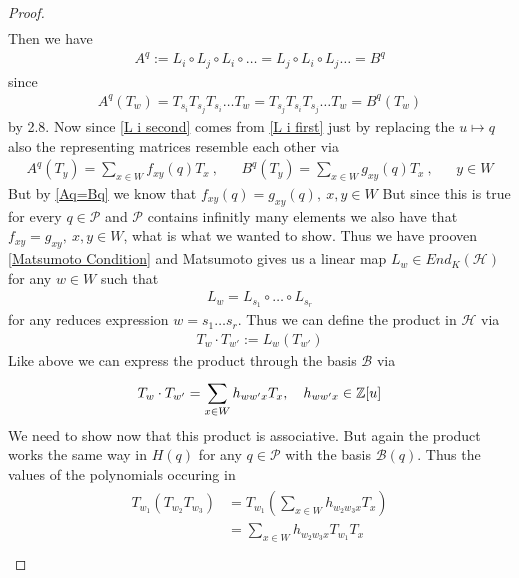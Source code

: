 \documentclass[]{article}
\begin{document}
\begin{proof}
\begin{align}
        \label{L i second}
    \end{align}
    Then we have
    \begin{align}
        A^q:= L_i\circ L_j \circ L_i \circ \dots = L_j \circ L_i \circ L_j  \dots = B^q 
        \label{Aq=Bq}
    \end{align}
    since 
    \begin{align*}
        A^q(T_w)=T_{s_i}T_{s_j}T_{s_i}\dots T_w = T_{s_j}T_{s_i}T_{s_j} \dots T_w = B^q(T_w)
    \end{align*}
    by 2.8. Now since \eqref{L i second} comes from \eqref{L i first} just by replacing the \(u \mapsto q\) also the representing matrices 
    resemble each other via
    \begin{align*}
        A^q(T_y)=\sum_{x \in W}^{} f_{xy}(q) T_x \ , &&  B^q(T_y)=\sum_{x \in W}^{} g_{xy}(q) T_x \ , &&y \in W
    \end{align*}
    But by \eqref{Aq=Bq} we know that \(f_{xy}(q)=g_{xy}(q), \ x,y \in W\) But since this is true for every \(q \in \mathscr{P}\) 
    and \(\mathscr{P}\) contains infinitly many elements we also have that \(f_{xy}=g_{xy}, \ x,y \in W\), what is what we wanted to show.
    Thus we have prooven \eqref{Matsumoto Condition} and Matsumoto gives us a linear map \(L_w \in End_K(\mathscr{H})\) for any \(w \in W\)
    such that
    \begin{align*}
        L_w = L_{s_1} \circ \dots \circ L_{s_r}
    \end{align*}
    for any reduces expression \(w = s_1 \dots s_r\). Thus we can define the product in \(\mathscr{H}\) via
    \begin{align*}
        T_w \cdot T_{w'} := L_w(T_{w'})
    \end{align*}
    Like above we can express the product through the basis \(\mathscr{B}\) via
    \begin{align*}
        T_w \cdot T_{w'} = \sum_{x \in W}^{} h_{ww'x}T_x, \quad h_{ww'x} \in {\mathbb{Z}}[u]
    \end{align*}
    We need to show now that this product is associative. But again the product works the same way in 
    \(H(q)\) for any \(q \in \mathscr{P}\) with the basis \(\mathscr{B}(q)\).
    Thus the values of the polynomials occuring in 
    \begin{align}
        \begin{split}
            T_{w_1}(T_{w_2}T_{w_3})&=T_{w_1} \left(\sum_{x \in W}^{} h_{w_2w_3x}T_x\right) \\
            &= \sum_{x \in W}^{} h_{w_2w_3x} T_{w_1}T_x \\

\end{split}
\end{align}
\end{proof}
\end{document}
